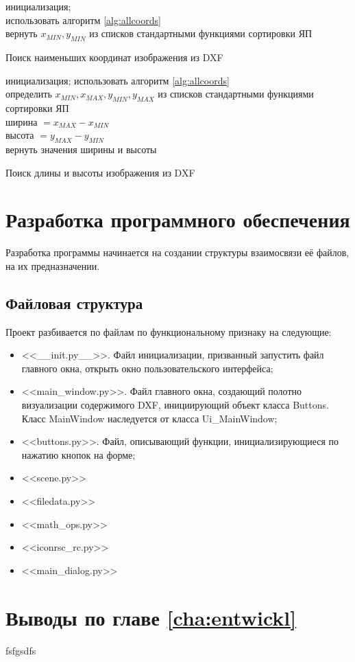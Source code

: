 \begin{algorithm}[H]
	\SetAlgoLined
	инициализация;\\
	использовать алгоритм \ref{alg:allcoords}\\
	вернуть $x_{MIN}, y_{MIN}$ из списков стандартными функциями сортировки ЯП
	\caption{Поиск наименьших координат изображения из DXF}
	\label{alg:extremums}
\end{algorithm}

\begin{algorithm}[H]
	\SetAlgoLined
	инициализация;
	использовать алгоритм \ref{alg:allcoords}\\
	определить $x_{MIN}, x_{MAX}, y_{MIN}, y_{MAX}$ из списков стандартными функциями сортировки ЯП\\
	ширина $=x_{MAX}-x_{MIN}$\\
	высота $=y_{MAX}-y_{MIN}$\\
	вернуть значения ширины и высоты
	\caption{Поиск длины и высоты изображения из DXF}
	\label{alg:dimes}
\end{algorithm}

\section{Разработка программного обеспечения}
Разработка программы начинается на создании структуры взаимосвязи её файлов, на их предназначении.

\subsection{Файловая структура}

Проект разбивается по файлам по функциональному признаку на следующие:
\begin{itemize}
	\item <<\_\_init.py\_\_>>. Файл инициализации, призванный запустить файл главного окна, открыть окно пользовательского интерфейса;
	\item <<main\_window.py>>. Файл главного окна, создающий полотно визуализации содержимого DXF, инициирующий объект класса Buttons. Класс MainWindow наследуется от класса Ui\_MainWindow;
	\item <<buttons.py>>. Файл, описывающий функции, инициализирующиеся по нажатию кнопок на форме; 
	\item <<scene.py>>
	\item <<filedata.py>>
	\item <<math\_ops.py>>
	\item <<iconrsc\_rc.py>>
	\item <<main\_dialog.py>>
\end{itemize}




\section{Выводы по главе \ref{cha:entwickl}}
fsfgsdfs
